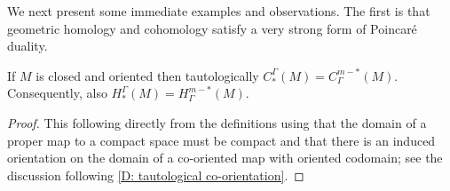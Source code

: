 We next present some immediate examples and observations.
The first is that geometric homology and cohomology satisfy a very strong form of Poincar\'e duality.

\begin{theorem}\label{T: PD}
	If $M$ is closed and oriented then tautologically $C_*^\Gamma(M) = C_\Gamma^{m-*}(M)$.
	Consequently, also $H_*^\Gamma(M) = H_\Gamma^{m-*}(M)$.
\end{theorem}
\begin{proof}
	This following directly from the definitions using that the domain of a proper map to a compact space must be compact and that there is an induced orientation on the domain of a co-oriented map with oriented codomain; see the discussion following \cref{D: tautological co-orientation}.
\end{proof}



